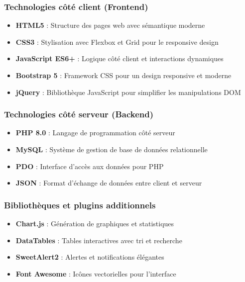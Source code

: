 \documentclass[12pt,a4paper]{report}
\begin{document}
\subsubsection{Technologies côté client (Frontend)}
\begin{itemize}
    \item \textbf{HTML5} : Structure des pages web avec sémantique moderne
    \item \textbf{CSS3} : Stylisation avec Flexbox et Grid pour le responsive design
    \item \textbf{JavaScript ES6+} : Logique côté client et interactions dynamiques
    \item \textbf{Bootstrap 5} : Framework CSS pour un design responsive et moderne
    \item \textbf{jQuery} : Bibliothèque JavaScript pour simplifier les manipulations DOM
\end{itemize}

\subsubsection{Technologies côté serveur (Backend)}
\begin{itemize}
    \item \textbf{PHP 8.0} : Langage de programmation côté serveur
    \item \textbf{MySQL} : Système de gestion de base de données relationnelle
    \item \textbf{PDO} : Interface d'accès aux données pour PHP
    \item \textbf{JSON} : Format d'échange de données entre client et serveur
\end{itemize}

\subsubsection{Bibliothèques et plugins additionnels}
\begin{itemize}
    \item \textbf{Chart.js} : Génération de graphiques et statistiques
    \item \textbf{DataTables} : Tables interactives avec tri et recherche
    \item \textbf{SweetAlert2} : Alertes et notifications élégantes
    \item \textbf{Font Awesome} : Icônes vectorielles pour l'interface
\end{itemize}
\end{document}
